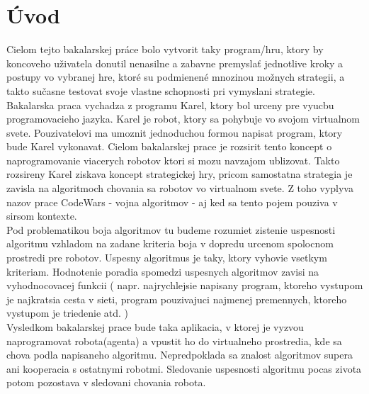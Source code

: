 \documentclass[a4paper,11pt,final]{report}
\begin{document}
\chapter{Úvod}
                                   
Cielom tejto bakalarskej práce bolo vytvorit taky program/hru, ktory by koncoveho uživatela donutil nenasilne a zabavne premyslať jednotlive kroky a postupy vo vybranej hre, ktoré su podmienené mnozinou možnych strategii, a takto sučasne testovat svoje vlastne schopnosti pri vymyslani strategie.\\

Bakalarska praca vychadza z programu Karel, ktory bol urceny pre vyucbu programovacieho jazyka. Karel je robot, ktory sa pohybuje vo svojom virtualnom svete. Pouzivatelovi ma umoznit jednoduchou formou napisat program, ktory bude Karel vykonavat. Cielom bakalarskej prace je rozsirit tento koncept o naprogramovanie viacerych robotov ktori si mozu navzajom ublizovat. Takto rozsireny Karel ziskava koncept strategickej hry, pricom samostatna strategia je zavisla na algoritmoch chovania sa robotov vo virtualnom svete. Z toho vyplyva nazov prace CodeWars - vojna algoritmov - aj ked sa tento pojem pouziva v sirsom kontexte.\\
Pod problematikou boja algoritmov tu budeme rozumiet zistenie uspesnosti algoritmu vzhladom na zadane kriteria boja v dopredu urcenom spolocnom prostredi pre robotov. Uspesny algoritmus je taky, ktory vyhovie vsetkym kriteriam. Hodnotenie poradia spomedzi uspesnych algoritmov zavisi na vyhodnocovacej funkcii ( napr. najrychlejsie napisany program, ktoreho vystupom je najkratsia cesta v sieti, program pouzivajuci najmenej premennych, ktoreho vystupom je triedenie atd. ) \\
Vysledkom bakalarskej prace bude taka aplikacia, v ktorej je vyzvou naprogramovat robota(agenta) a vpustit ho do virtualneho prostredia, kde sa chova podla napisaneho algoritmu. Nepredpoklada sa znalost algoritmov supera ani kooperacia s ostatnymi robotmi. Sledovanie uspesnosti algoritmu pocas zivota potom pozostava v sledovani chovania robota.\\
\end{document}
